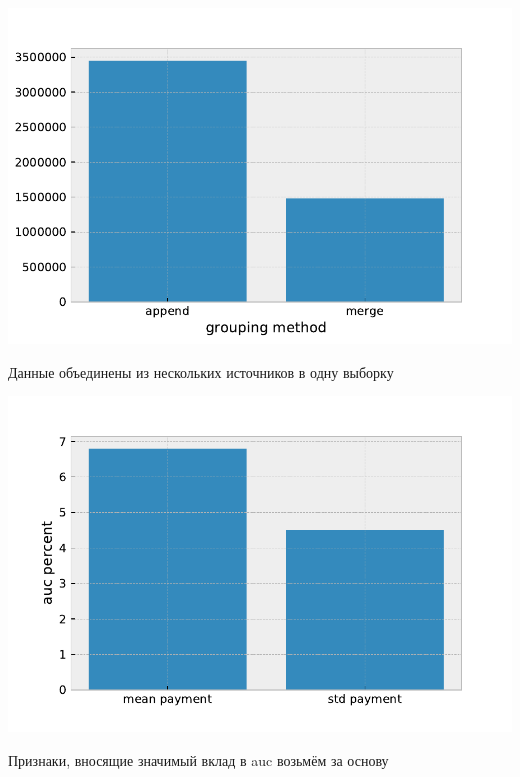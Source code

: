 \documentclass[russian, 10pt]{beamer}
\begin{document}
\begin{frame}
\includegraphics[scale=0.7]{images/grouping.pdf}

Данные объединены из нескольких источников в одну выборку

\end{frame}


\begin{frame}

\includegraphics[scale=0.7]{images/meanstd_auc.pdf}

Признаки, вносящие значимый вклад в auc возьмём за основу

\end{frame}
\end{document}
